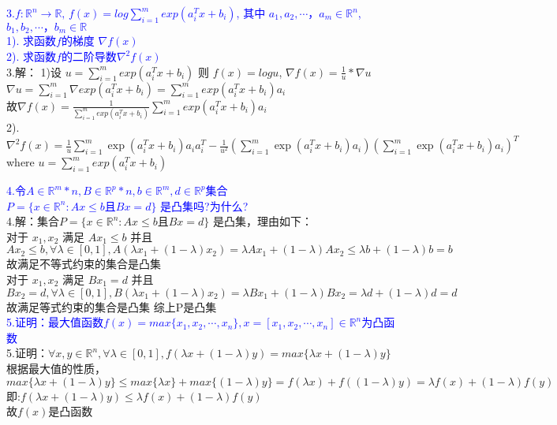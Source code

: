 \documentclass{article}
\begin{document}
\textcolor{blue}{3.$f: \mathbb{R}^n \rightarrow \mathbb{R},\, f(x) = log\sum_{i=1}^m exp(a_i^Tx+b_i)$, 其中 $a_1, a_2, \cdots ， a_m \in  \mathbb{R}^n $,
$b_1, b_2, \cdots ， b_m \in  \mathbb{R} $\\
1). 求函数$f$的梯度 $\nabla f(x)$\\
2). 求函数$f$的二阶导数$\nabla^2 f(x)$}\\
3.解：
1)设 $u =\sum_{i=1}^m exp(a_i^Tx+b_i)$ 则 $f(x) = log u$, $\nabla f(x) = \frac{1}{u} * \nabla u$\\
$\nabla u = \sum_{i=1}^m \nabla exp(a_i^Tx+b_i) = \sum_{i=1}^m exp(a_i^Tx+b_i)a_i$\\
故$\nabla f(x) = \frac{1}{\sum_{i=1}^m exp(a_i^Tx+b_i)} \sum_{i=1}^m exp(a_i^Tx+b_i)a_i$\\
2).$\nabla^2 f(x) = \frac{1}{u} \sum_{i=1}^m \exp(a_i^T x + b_i) a_i a_i^T - \frac{1}{u^2} \left( \sum_{i=1}^m \exp(a_i^T x + b_i) a_i \right) \left( \sum_{i=1}^m \exp(a_i^T x + b_i) a_i \right)^T$\\
where $u =\sum_{i=1}^m exp(a_i^Tx+b_i)$



\textcolor{blue}{4.令$A \in \mathbb{R}^m*n , B \in \mathbb{R}^p*n, b \in  \mathbb{R}^m, d \in \mathbb{R}^p$集合\\
$P = \{x \in \mathbb{R}^n : Ax \leq b 且 Bx = d \}$
是凸集吗?为什么?}\\
4.解：集合$P = \{x \in \mathbb{R}^n : Ax \leq b 且 Bx = d \}$ 是凸集，理由如下：\\
对于 $x_1,x_2$ 满足 $Ax_1 \leq b $ 并且 $Ax_2 \leq b, \forall \lambda \in [0,1],A(\lambda x_1 + (1-\lambda)x_2) = \lambda Ax_1 + (1-\lambda)Ax_2 \leq \lambda b + (1-\lambda)b = b$\\
故满足不等式约束的集合是凸集\\
对于 $x_1,x_2$ 满足 $Bx_1 = d $ 并且 $Bx_2 = d, \forall \lambda \in [0,1], B(\lambda x_1 + (1-\lambda)x_2) = \lambda Bx_1 + (1-\lambda)Bx_2 = \lambda d + (1-\lambda)d = d$\\
故满足等式约束的集合是凸集
综上P是凸集\\

\textcolor{blue}{5.证明：最大值函数$f(x) = max\{x_1,x_2,\cdots ,x_n\}, x = [x_1,x_2, \cdots , x_n] \in \mathbb{R}^n$为凸函数}\\
5.证明：$\forall x,y \in \mathbb{R}^n, \forall \lambda \in [0,1],f(\lambda x+ (1-\lambda)y) = max\{ \lambda x + (1-\lambda)y\}$\\
根据最大值的性质，$ max\{ \lambda x + (1-\lambda)y\} \leq max\{ \lambda x\} + max\{ (1-\lambda)y\} = f(\lambda x) + f((1 - \lambda)y) = \lambda f(x) + (1-\lambda)f(y)$\\
即:$f(\lambda x+ (1-\lambda)y) \leq \lambda f(x) + (1-\lambda)f(y)$\\
故$f(x)$是凸函数
\end{document}
